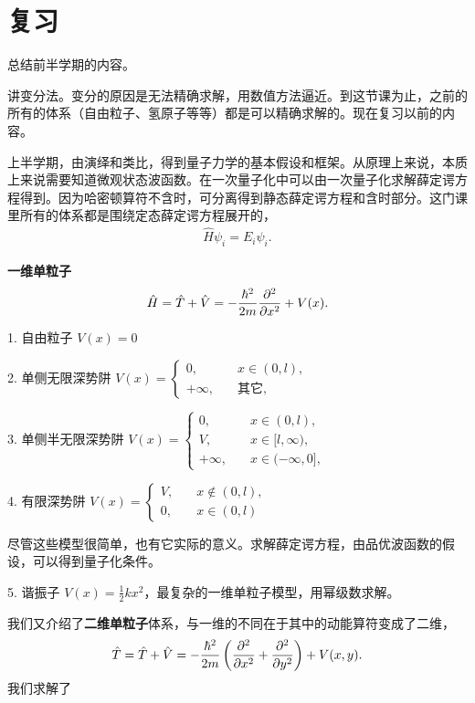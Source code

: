 \section{复习}
总结前半学期的内容。

讲变分法。变分的原因是无法精确求解，用数值方法逼近。到这节课为止，之前的所有的体系（自由粒子、氢原子等等）都是可以精确求解的。现在复习以前的内容。

上半学期，由演绎和类比，得到量子力学的基本假设和框架。从原理上来说，本质上来说需要知道微观状态波函数。在一次量子化中可以由一次量子化求解薛定谔方程得到。因为哈密顿算符不含时，可分离得到静态薛定谔方程和含时部分。这门课里所有的体系都是围绕定态薛定谔方程展开的，
\begin{align}
    \hat H \psi_i = E_i \psi_i.
\end{align}

\textbf{一维单粒子}
\begin{align}
    \hat H = \hat T + \hat V = -\frac{\hbar^2}{2m} \pdv[2]x + V(x). 
\end{align}

1. 自由粒子  $V(x) = 0$

2. 单侧无限深势阱
$V(x) = \begin{cases}
    0, \quad &x\in(0,l),\\
    +\infty, \quad &\text{其它},
\end{cases}$

3. 单侧半无限深势阱 $V(x)=\begin{cases}
    0, \quad &x\in(0,l), \\
    V, \quad &x\in[l,\infty), \\
    +\infty, \quad &x\in(-\infty, 0], 
\end{cases}$

4. 有限深势阱 $V(x) = \begin{cases}
    V, \quad &x \notin (0,l), \\
    0, \quad &x\in(0,l)
\end{cases}$

尽管这些模型很简单，也有它实际的意义。求解薛定谔方程，由品优波函数的假设，可以得到量子化条件。

5. 谐振子 $V(x) = \frac12 kx^2$，最复杂的一维单粒子模型，用幂级数求解。

我们又介绍了\textbf{二维单粒子}体系，与一维的不同在于其中的动能算符变成了二维，
\begin{align}
    \hat T = \hat T + \hat V = -\frac{\hbar^2}{2m} \left(\pdv[2]x + \pdv[2]y\right) + V(x,y). 
\end{align}
我们求解了

